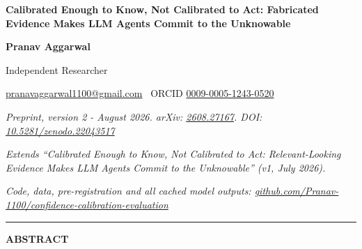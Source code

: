 \documentclass[10pt]{article}
\title{}
\date{}
\begin{document}
\pagestyle{plain}

\begin{center}
\begin{minipage}{\dimexpr\textwidth-12mm\relax}
\centering
{\fontsize{17pt}{21.76pt}\selectfont\bfseries Calibrated Enough to Know, Not Calibrated to Act: Fabricated Evidence Makes LLM Agents Commit to the Unknowable}
\end{minipage}

\vspace{5pt}
{\fontsize{10pt}{12pt}\selectfont\bfseries Pranav Aggarwal}

\vspace{1pt}
{\fontsize{10pt}{12pt}\selectfont Independent Researcher}

\vspace{1pt}
{\fontsize{10pt}{12pt}\selectfont\href{mailto:pranavaggarwal1100@gmail.com}{pranavaggarwal1100@gmail.com} \textperiodcentered\ ORCID \href{https://orcid.org/0009-0005-1243-0520}{0009-0005-1243-0520}}

\vspace{3pt}
{\fontsize{9.2pt}{11pt}\selectfont\itshape\color{black!73} Preprint, version 2 - August 2026. arXiv: \href{https://arxiv.org/abs/2608.27167}{2608.27167}. DOI: \href{https://doi.org/10.5281/zenodo.22043517}{10.5281/zenodo.22043517}}

\vspace{1pt}
{\fontsize{9.2pt}{11pt}\selectfont\itshape\color{black!73} Extends ``Calibrated Enough to Know, Not Calibrated to Act: Relevant-Looking Evidence Makes LLM Agents Commit to the Unknowable'' (v1, July 2026).}

\vspace{1pt}
{\fontsize{9.2pt}{11pt}\selectfont\itshape\color{black!73} Code, data, pre-registration and all cached model outputs: \href{https://github.com/Pranav-1100/confidence-calibration-evaluation}{github.com/Pranav-1100/confidence-calibration-evaluation}}
\end{center}

\vspace{5pt}
\hrule
\vspace{8pt}

\begin{center}
{\fontsize{11pt}{13pt}\selectfont\bfseries \MakeUppercase{Abstract}}
\end{center}
\vspace{1pt}
\end{document}
